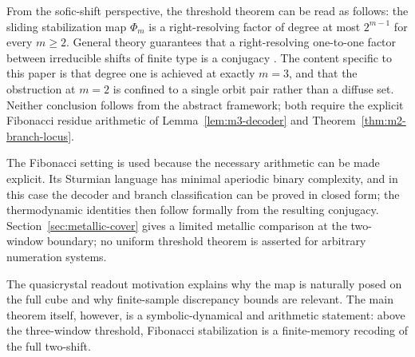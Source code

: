 From the sofic-shift perspective, the threshold theorem can be read as follows: the sliding stabilization map $\Phi_m$ is a right-resolving factor of degree at most $2^{m-1}$ for every $m\ge 2$. General theory guarantees that a right-resolving one-to-one factor between irreducible shifts of finite type is a conjugacy \cite{Ashley1991,LindMarcus1995}. The content specific to this paper is that degree one is achieved at exactly $m=3$, and that the obstruction at $m=2$ is confined to a single orbit pair rather than a diffuse set. Neither conclusion follows from the abstract framework; both require the explicit Fibonacci residue arithmetic of Lemma~\ref{lem:m3-decoder} and Theorem~\ref{thm:m2-branch-locus}.

The Fibonacci setting is used because the necessary arithmetic can be made explicit.  Its Sturmian language has minimal aperiodic binary complexity, and in this case the decoder and branch classification can be proved in closed form; the thermodynamic identities then follow formally from the resulting conjugacy.  Section~\ref{sec:metallic-cover} gives a limited metallic comparison at the two-window boundary; no uniform threshold theorem is asserted for arbitrary numeration systems.

The quasicrystal readout motivation explains why the map is naturally posed on the full cube and why finite-sample discrepancy bounds are relevant.  The main theorem itself, however, is a symbolic-dynamical and arithmetic statement: above the three-window threshold, Fibonacci stabilization is a finite-memory recoding of the full two-shift.
